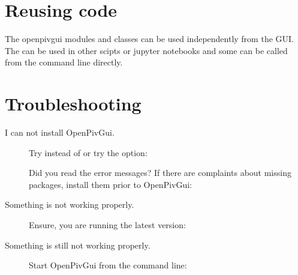 \documentclass[letterpaper,10pt,english]{sphinxmanual}
\begin{document}
\section{Reusing code}
\label{\detokenize{usage:reusing-code}}
The openpivgui modules and classes can be used independently from the GUI. The can be used in other scipts or jupyter notebooks and some can be called from the command line directly.


\section{Troubleshooting}
\label{\detokenize{usage:troubleshooting}}\begin{description}
\item[{I can not install OpenPivGui.}] \leavevmode
Try  instead of  or try the  option:

\begin{sphinxVerbatim}[commandchars=\\\{\}]
   
\end{sphinxVerbatim}

Did you read the error messages? If there are complaints about missing packages, install them prior to OpenPivGui:

\begin{sphinxVerbatim}[commandchars=\\\{\}]
  
\end{sphinxVerbatim}

\item[{Something is not working properly.}] \leavevmode
Ensure, you are running the latest version:

\begin{sphinxVerbatim}[commandchars=\\\{\}]
   
\end{sphinxVerbatim}

\item[{Something is still not working properly.}] \leavevmode
Start OpenPivGui from the command line:

\begin{sphinxVerbatim}[commandchars=\\\{\}]
  
\end{sphinxVerbatim}


\end{description}
\end{document}
